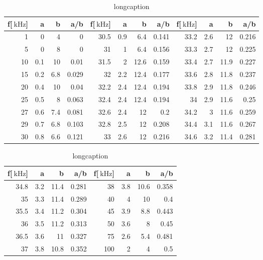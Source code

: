 \begin{table}
\begin{center}
\begin{tabular}{r|r|r|r|r|r|r|r|r|r|r|r|}
f[$\SI{}{\kilo\hertz}$] & a & b & a/b & f[$\SI{}{\kilo\hertz}$] & a & b & a/b & f[$\SI{}{\kilo\hertz}$] & a & b & a/b\\
\hline
1 & 0 & 4 & 0 & 30.5 & 0.9 & 6.4 & 0.141 & 33.2 & 2.6 & 12 & 0.216\\
5 & 0 & 8 & 0 & 31 & 1 & 6.4 & 0.156 & 33.3 & 2.7 & 12 & 0.225\\
10 & 0.1 & 10 & 0.01 & 31.5 & 2 & 12.6 & 0.159 & 33.4 & 2.7 & 11.9 & 0.227\\
15 & 0.2 & 6.8 & 0.029 & 32 & 2.2 & 12.4 & 0.177 & 33.6 & 2.8 & 11.8 & 0.237\\
20 & 0.4 & 10 & 0.04 & 32.2 & 2.4 & 12.4 & 0.194 & 33.8 & 2.9 & 11.8 & 0.246\\
25 & 0.5 & 8 & 0.063 & 32.4 & 2.4 & 12.4 & 0.194 & 34 & 2.9 & 11.6 & 0.25\\
27 & 0.6 & 7.4 & 0.081 & 32.6 & 2.4 & 12 & 0.2 & 34.2 & 3 & 11.6 & 0.259\\
29 & 0.7 & 6.8 & 0.103 & 32.8 & 2.5 & 12 & 0.208 & 34.4 & 3.1 & 11.6 & 0.267\\
30 & 0.8 & 6.6 & 0.121 & 33 & 2.6 & 12 & 0.216 & 34.6 & 3.2 & 11.4 & 0.281\\
\end{tabular}
\end{center}
\begin{center}
\begin{tabular}{r|r|r|r|r|r|r|r}
f[$\SI{}{\kilo\hertz}$] & a & b & a/b & f[$\SI{}{\kilo\hertz}$] & a & b & a/b \\
\hline
34.8 & 3.2 & 11.4 & 0.281 & 38 & 3.8 & 10.6 & 0.358 \\
35 & 3.3 & 11.4 & 0.289 & 40 & 4 & 10 & 0.4 \\
35.5 & 3.4 & 11.2 & 0.304 & 45 & 3.9 & 8.8 & 0.443 \\
36 & 3.5 & 11.2 & 0.313 & 50 & 3.6 & 8 & 0.45 \\
36.5 & 3.6 & 11 & 0.327 & 75 & 2.6 & 5.4 & 0.481 \\
37 & 3.8 & 10.8 & 0.352 & 100 & 2 & 4 & 0.5 \\
\end{tabular}
\caption[smallcaption]{longcaption}
\label{phase}
\end{center}
\end{table}
